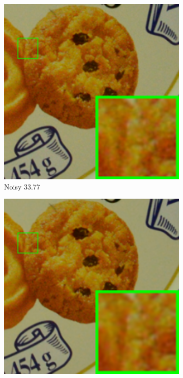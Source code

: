 \begin{figure}
    \centering
    \begin{subfigure}[t]{0.19\textwidth}
        \centering
        \includegraphics[width=1\textwidth]{images/guided/cc15/resize_br_Noisy_d600_iso3200_2_real.png}
		\caption{Noisy 33.77}
    \end{subfigure}
    \hfill
    \begin{subfigure}[t]{0.19\textwidth}
        \centering
        \includegraphics[width=1\textwidth]{images/guided/cc15/resize_br_CBM3D_d600_iso3200_2_real.png}

\end{subfigure}
\end{figure}
